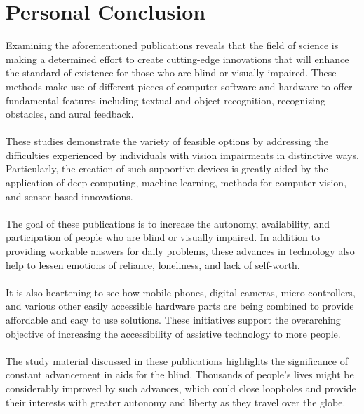 \documentclass[MScCS]{uccthesis}
\begin{document}

\section{Personal Conclusion}
Examining the aforementioned publications reveals that the field of science is making a determined effort to create cutting-edge innovations that will enhance the standard of existence for those who are blind or visually impaired. These methods make use of different pieces of computer software and hardware to offer fundamental features including textual and object recognition, recognizing obstacles, and aural feedback.\\
\\These studies demonstrate the variety of feasible options by addressing the difficulties experienced by individuals with vision impairments in distinctive ways. Particularly, the creation of such supportive devices is greatly aided by the application of deep computing, machine learning, methods for computer vision, and sensor-based innovations.\\
\\The goal of these publications is to increase the autonomy, availability, and participation of people who are blind or visually impaired. In addition to providing workable answers for daily problems, these advances in technology also help to lessen emotions of reliance, loneliness, and lack of self-worth.\\
\\It is also heartening to see how mobile phones, digital cameras, micro-controllers, and various other easily accessible hardware parts are being combined to provide affordable and easy to use solutions. These initiatives support the overarching objective of increasing the accessibility of assistive technology to more people.\\
\\The study material discussed in these publications highlights the significance of constant advancement in aids for the blind. Thousands of people's lives might be considerably improved by such advances, which could close loopholes and provide their interests with greater autonomy and liberty as they travel over the globe.
\end{document}
